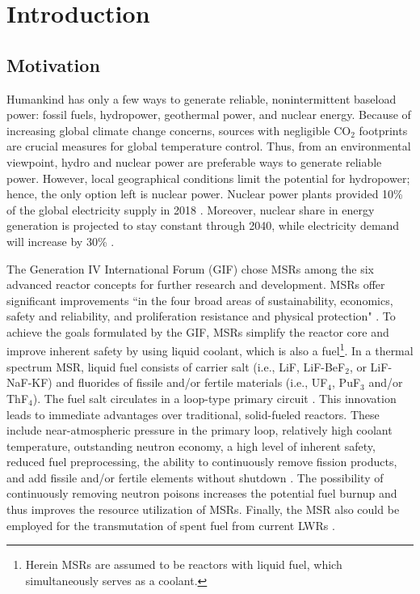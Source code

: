 \chapter{Introduction}
\section{Motivation}
Humankind has only a few ways to generate reliable, nonintermittent baseload 
power: fossil fuels, hydropower, geothermal power, and nuclear energy. 
Because of increasing global climate change concerns, sources with negligible 
CO$_2$ footprints are crucial measures for global temperature control. Thus, 
from an environmental viewpoint, hydro and nuclear power are preferable ways 
to generate reliable power. However,  local geographical conditions limit the 
potential for hydropower; hence, the only option left is nuclear power. 
Nuclear power plants provided 10\% of the global electricity supply in 2018 
\cite{iea_nuclear_2019}. Moreover, nuclear share in energy generation is 
projected to stay constant through 2040, while electricity demand will 
increase by 30\% \cite{noauthor_world_2017}. 

The Generation IV International Forum (GIF) chose \glspl{MSR} among the six 
advanced reactor concepts for further research and development. \glspl{MSR} 
offer significant improvements ``in the four broad areas of sustainability, 
economics, safety and reliability, and proliferation resistance and physical 
protection" \cite{doe_technology_2002}. To achieve the goals formulated by the 
GIF, \glspl{MSR} simplify the reactor core and improve inherent safety by 
using liquid coolant, which is also a fuel\footnote{Herein \glspl{MSR} are 
assumed to be reactors with liquid fuel, which simultaneously serves as a 
coolant.}. In a thermal spectrum \gls{MSR}, liquid fuel consists of carrier 
salt (i.e., LiF, LiF-BeF$_2$, or LiF-NaF-KF) and fluorides of fissile and/or 
fertile materials (i.e., UF$_4$, PuF$_3$ and/or ThF$_4$). The fuel salt 
circulates in a loop-type primary circuit \cite{haubenreich_experience_1970}. 
This innovation leads to immediate advantages over traditional, solid-fueled 
reactors. These include near-atmospheric pressure in the primary loop, 
relatively high coolant temperature, outstanding neutron economy, a high level 
of inherent safety, reduced fuel preprocessing, the ability to continuously 
remove fission products, and add fissile and/or fertile elements without 
shutdown \cite{leblanc_molten_2010}. The possibility of continuously 
removing neutron poisons increases the potential fuel burnup and thus 
improves the resource utilization of \glspl{MSR}. Finally, the \gls{MSR} 
also could be employed for the transmutation of spent fuel from current 
\glspl{LWR} \cite{fratoni_design_2004}.

